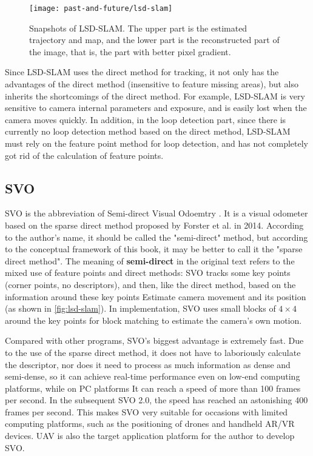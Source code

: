 \begin{figure}[!ht]
	\centering
	\texttt{[image: past-and-future/lsd-slam]}
	\caption{Snapshots of LSD-SLAM. The upper part is the estimated trajectory and map, and the lower part is the reconstructed part of the image, that is, the part with better pixel gradient.}
	\label{fig:lsd-slam}
\end{figure}

Since LSD-SLAM uses the direct method for tracking, it not only has the advantages of the direct method (insensitive to feature missing areas), but also inherits the shortcomings of the direct method. For example, LSD-SLAM is very sensitive to camera internal parameters and exposure, and is easily lost when the camera moves quickly. In addition, in the loop detection part, since there is currently no loop detection method based on the direct method, LSD-SLAM must rely on the feature point method for loop detection, and has not completely got rid of the calculation of feature points.

\subsection{SVO}
SVO is the abbreviation of Semi-direct Visual Odoemtry \textsuperscript{\cite{Forster2014}}. It is a visual odometer based on the sparse direct method proposed by Forster et al. in 2014. According to the author's name, it should be called the "semi-direct" method, but according to the conceptual framework of this book, it may be better to call it the "sparse direct method". The meaning of \textbf{semi-direct} in the original text refers to the mixed use of feature points and direct methods: SVO tracks some key points (corner points, no descriptors), and then, like the direct method, based on the information around these key points Estimate camera movement and its position (as shown in \autoref{fig:lsd-slam}). In implementation, SVO uses small blocks of $4\times4$ around the key points for block matching to estimate the camera's own motion.

Compared with other programs, SVO's biggest advantage is extremely fast. Due to the use of the sparse direct method, it does not have to laboriously calculate the descriptor, nor does it need to process as much information as dense and semi-dense, so it can achieve real-time performance even on low-end computing platforms, while on PC platforms It can reach a speed of more than 100 frames per second. In the subsequent SVO 2.0, the speed has reached an astonishing 400 frames per second. This makes SVO very suitable for occasions with limited computing platforms, such as the positioning of drones and handheld AR/VR devices. UAV is also the target application platform for the author to develop SVO.


